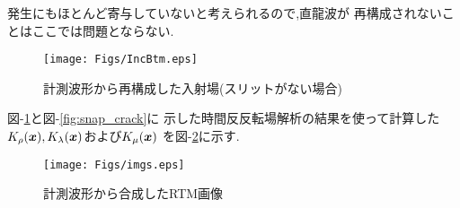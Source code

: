 発生にもほとんど寄与していないと考えられるので,直龍波が
再構成されないことはここでは問題とならない.
\begin{figure}[htb]
\centering
	\texttt{[image: Figs/IncBtm.eps]}
	\caption{計測波形から再構成した入射場(スリットがない場合)}
	\label{fig:inc_btm}
\end{figure}
{\rm 図}-\ref{fig:inc_btm}と{\rm 図}-\ref{fig:snap_crack}に
示した時間反反転場解析の結果を使って計算した
$K_\rho(\boldsymbol{x}),K_{\lambda}(\boldsymbol{x})$および$K_{\mu}(\boldsymbol{x})$
を{図-}\ref{fig:imgs}に示す.
\begin{figure}[htb]
\centering
	\texttt{[image: Figs/imgs.eps]}
	\caption{計測波形から合成したRTM画像}
	\label{fig:imgs}
\end{figure}

